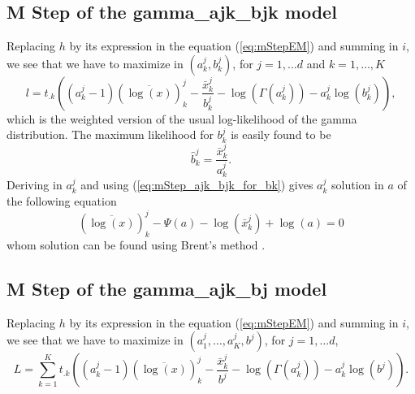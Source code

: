\documentclass[a4paper,10pt]{article}
\begin{document}
\subsection{M Step of the gamma\_ajk\_bjk model}
Replacing $h$ by its expression in the equation (\ref{eq:mStepEM}) and summing in $i$, we see that we have to maximize in
$(a^j_k,b^j_k)$, for $j=1,\ldots d$ and $k=1,\ldots, K$
\begin{equation}\label{eq:mStep_ajk_bjk}
l = t_{.k} \left( (a^j_k-1)(\overline{\log(x)})^j_k - \frac{\bar{x}^j_k}{b^j_k} - \log(\Gamma(a^j_k)) - a^j_k \log(b^j_k) \right),
\end{equation}
which is the weighted version of the usual log-likelihood of the gamma distribution. The maximum likelihood for $b^j_k$ is
easily found to be
\begin{equation}\label{eq:mStep_ajk_bjk_for_bk}
\hat{b}^j_k = \frac{\bar{x}^j_k}{a^j_k}.
\end{equation}
Deriving in $a^j_k$ and using (\ref{eq:mStep_ajk_bjk_for_bk}) gives $a^j_k$ solution in $a$ of the
following equation
\begin{equation}\label{eq:mStep_ajk_bjk_zero}
  (\overline{\log(x)})^j_k - \Psi(a) - \log(\bar{x}^j_k) + \log(a) =0
\end{equation}
whom solution can be found using Brent's method \cite{Brent1973}.

\subsection{M Step of the gamma\_ajk\_bj model}
Replacing $h$ by its expression in the equation (\ref{eq:mStepEM}) and summing in $i$, we see that we have to maximize in
$(a^j_1,\ldots, a^j_K, b^j)$, for $j=1,\ldots d$,
\begin{equation}\label{eq:mStep_ajk_bj}
L =\sum_{k=1}^{K} t_{.k} \left( (a^j_k-1)(\overline{\log(x)})^j_k - \frac{\bar{x}^j_k}{b^j} - \log(\Gamma(a^j_k)) - a^j_k \log(b^j) \right).
\end{equation}
\end{document}
